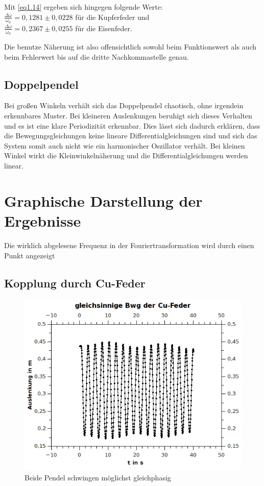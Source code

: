 Mit \cref{eq1.14} ergeben sich hingegen folgende Werte:\\
$\frac{\Delta \omega}{\omega_0}=0,1281 \pm 0,0228$ für die Kupferfeder und\\
$\frac{\Delta \omega}{\omega_0}=0,2367 \pm 0,0255 $ für die Eisenfeder.

Die benutze Näherung ist also offensichtlich sowohl beim Funktionswert als auch beim Fehlerwert bis auf die dritte Nachkommastelle genau.
\subsection{Doppelpendel}

Bei großen Winkeln verhält sich das Doppelpendel chaotisch, ohne irgendein erkennbares Muster. Bei kleineren Auslenkungen beruhigt sich dieses Verhalten und es ist eine klare Periodizität erkennbar. Dies lässt sich dadurch erklären, dass die Bewegungsgleichungen keine lineare Differentialgleichungen sind und sich das System somit auch nicht wie ein harmonischer Oszillator verhält. Bei kleinen Winkel wirkt die Kleinwinkelnäherung und die Differentialgleichungen werden linear.
\clearpage

\section{Graphische Darstellung der Ergebnisse}

Die wirklich abgelesene Frequenz in der Fouriertransformation wird durch einen Punkt angezeigt

\subsection{Kopplung durch Cu-Feder}

\begin{figure}[h!]
\centering
\includegraphics[width=0.6\linewidth]{../Messungen/graphen/gleich-Bwg-Cu}
\caption{Beide Pendel schwingen möglichst gleichphasig}
\label{fig:gleich-Bwg-Cu}
\end{figure}


